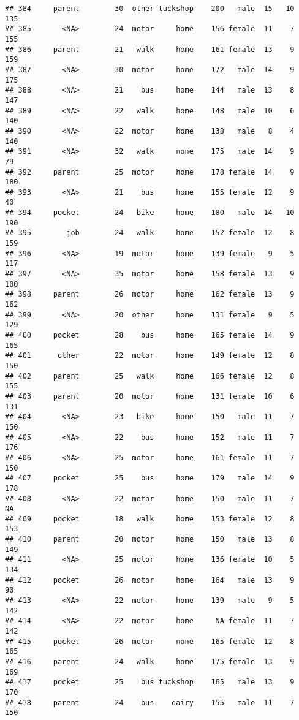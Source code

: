 \documentclass[
]{article}
\begin{document}
\begin{verbatim}
## 384     parent        30  other tuckshop    200   male  15   10     135
## 385       <NA>        24  motor     home    156 female  11    7     155
## 386     parent        21   walk     home    161 female  13    9     159
## 387       <NA>        30  motor     home    172   male  14    9     175
## 388       <NA>        21    bus     home    144   male  13    8     147
## 389       <NA>        22   walk     home    148   male  10    6     140
## 390       <NA>        22  motor     home    138   male   8    4     140
## 391       <NA>        32   walk     none    175   male  14    9      79
## 392     parent        25  motor     home    178 female  14    9     180
## 393       <NA>        21    bus     home    155 female  12    9      40
## 394     pocket        24   bike     home    180   male  14   10     190
## 395        job        24   walk     home    152 female  12    8     159
## 396       <NA>        19  motor     home    139 female   9    5     117
## 397       <NA>        35  motor     home    158 female  13    9     100
## 398     parent        26  motor     home    162 female  13    9     162
## 399       <NA>        20  other     home    131 female   9    5     129
## 400     pocket        28    bus     home    165 female  14    9     165
## 401      other        22  motor     home    149 female  12    8     150
## 402     parent        25   walk     home    166 female  12    8     155
## 403     parent        20  motor     home    131 female  10    6     131
## 404       <NA>        23   bike     home    150   male  11    7     150
## 405       <NA>        22    bus     home    152   male  11    7     176
## 406       <NA>        25  motor     home    161 female  11    7     150
## 407     pocket        25    bus     home    179   male  14    9     178
## 408       <NA>        22  motor     home    150   male  11    7      NA
## 409     pocket        18   walk     home    153 female  12    8     153
## 410     parent        20  motor     home    150   male  13    8     149
## 411       <NA>        25  motor     home    136 female  10    5     134
## 412     pocket        26  motor     home    164   male  13    9      90
## 413       <NA>        22  motor     home    139   male   9    5     142
## 414       <NA>        22  motor     home     NA female  11    7     142
## 415     pocket        26  motor     none    165 female  12    8     165
## 416     parent        24   walk     home    175 female  13    9     169
## 417     pocket        25    bus tuckshop    165   male  13    9     170
## 418     parent        24    bus    dairy    155   male  11    7     150

\end{verbatim}
\end{document}
